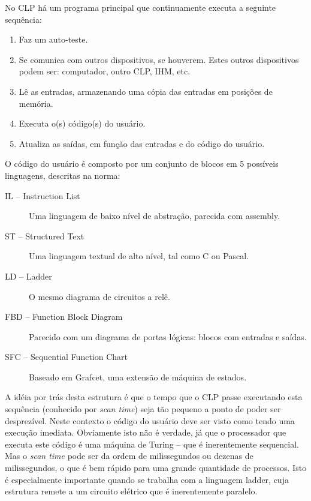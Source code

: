 No CLP há um programa principal que continuamente executa a seguinte sequência:
\begin{enumerate}
  \item Faz um auto-teste.
  \item Se comunica com outros dispositivos, se houverem. Estes outros dispositivos podem ser: computador, outro CLP, IHM, etc.
  \item Lê as entradas, armazenando uma cópia das entradas em posições de memória.
  \item Executa o(s) código(s) do usuário.
  \item Atualiza as saídas, em função das entradas e do código do usuário.
\end{enumerate}
O código do usuário é composto por um conjunto de blocos em 5 possíveis linguagens, descritas na norma:
\begin{description}
  \item[IL -- Instruction List] Uma linguagem de baixo nível de abstração, parecida com assembly.
  \item[ST -- Structured Text] Uma linguagem textual de alto nível, tal como C ou Pascal.
  \item[LD -- Ladder] O mesmo diagrama de circuitos a relê.
  \item[FBD -- Function Block Diagram] Parecido com um diagrama de portas lógicas: blocos com entradas e saídas.
  \item[SFC -- Sequential Function Chart] Baseado em Grafcet, uma extensão de máquina de estados.
\end{description}

A idéia por trás desta estrutura é que o tempo que o CLP passe executando esta sequência (conhecido por \emph{scan time}) seja tão pequeno a ponto de poder ser desprezível. Neste contexto o código do usuário deve ser visto como tendo uma execução imediata. Obviamente isto não é verdade, já que o processador que executa este código é uma máquina de Turing -- que é inerentemente sequencial. Mas o \emph{scan time} pode ser da ordem de milissegundos ou dezenas de milissegundos, o que é bem rápido para uma grande quantidade de processos. Isto é especialmente importante quando se trabalha com a linguagem ladder, cuja estrutura remete a um circuito elétrico que é inerentemente paralelo.


